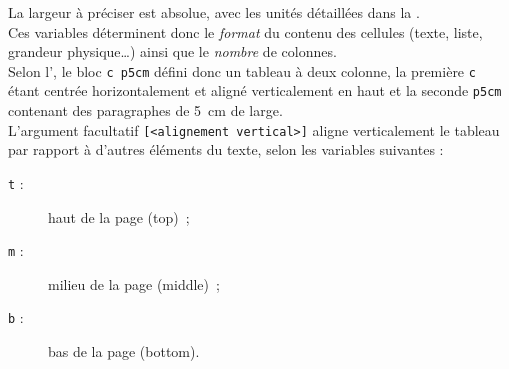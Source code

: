 \documentclass[a4paper, 11pt, twoside, fleqn]{memoir}
\begin{document}
La largeur à préciser est absolue, avec les unités détaillées dans la .\\ Ces variables déterminent donc le \emph{format} du contenu des cellules (texte, liste, grandeur physique\ldots) ainsi que le \emph{nombre} de colonnes.\\
Selon l', le bloc \texttt{{c p{5cm}}} défini donc un tableau à deux colonne, la première \texttt{c} étant centrée horizontalement et aligné verticalement en haut et la seconde \texttt{p{5cm}} contenant des paragraphes de \SI{5}{\centi\meter} de large.\\

L'argument facultatif \texttt{[<alignement vertical>]} aligne verticalement le tableau par rapport à d'autres éléments du texte, selon les variables suivantes :
\begin{description}
\item[\texttt{t} :] haut de la page (top) \,;
\item[\texttt{m} :] milieu de la page (middle) \,;
\item[\texttt{b} :] bas de la page (bottom).
\end{description}
\end{document}
